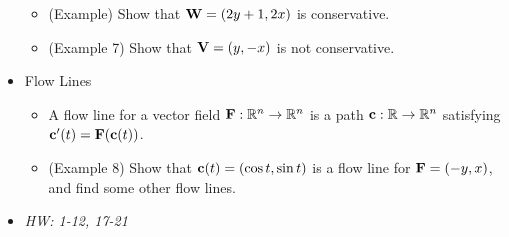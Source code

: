 \documentclass[11pt]{article}
\begin{document}
\begin{itemize}
\begin{itemize}
      \item (Example) Show that \(\mathbf{W}=\left(2y+1,2x\right)\) is conservative.
      \item (Example 7) Show that \(\mathbf{V}=\left(y,-x\right)\) is not conservative.
    \end{itemize}
  \item Flow Lines
    \begin{itemize}
      \item A flow line for a vector field \(\mathbf{F}:\mathbb R^n\to\mathbb R^n\)
        is a path \(\mathbf{c}:\mathbb R\to\mathbb R^n\) satisfying
        \(\mathbf{c}'(t)=\mathbf{F}(\mathbf{c}(t))\).
      \item (Example 8) Show that \(\mathbf{c}(t)=\left(\cos t,\sin t\right)\) is a flow
        line for \(\mathbf{F}=\left(-y,x\right)\), and find some other flow lines.
    \end{itemize}
  \item\textit{
    HW: 1-12, 17-21
  }
\end{itemize}
\end{document}
